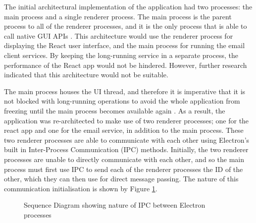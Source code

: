 The initial architectural implementation of the application had two processes: the main process and a single renderer process. The main process is the parent process to all of the renderer processes, and it is the only process that is able to call native GUI APIs \cite{electron-architecture}. This architecture would use the renderer process for displaying the React user interface, and the main process for running the email client services. By keeping the long-running service in a separate process, the performance of the React app would not be hindered. However, further research indicated that this architecture would not be suitable.

The main process houses the UI thread, and therefore it is imperative that it is not blocked with long-running operations to avoid the whole application from freezing until the main process becomes available again \cite{electron-performance}. As a result, the application was re-architected to make use of two renderer processes; one for the react app and one for the email service, in addition to the main process. These two renderer processes are able to communicate with each other using Electron's built in Inter-Process Communication (IPC) methods. Initially, the two renderer processes are unable to directly communicate with each other, and so the main process must first use IPC to send each of the renderer processes the ID of the other, which they can then use for direct message passing. The nature of this communication initialisation is shown by Figure \ref{fig:sequence-ipc}.

\begin{figure}[h!]
\begin{center}
  \caption{Sequence Diagram showing nature of IPC between Electron processes}
  \label{fig:sequence-ipc}
\end{center}
\end{figure}

